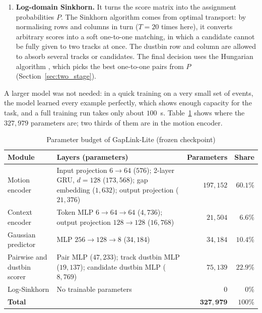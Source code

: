 \begin{enumerate}
    \item \textbf{Log-domain Sinkhorn.} It turns the score matrix into the assignment probabilities $P$. The Sinkhorn algorithm \cite{sinkhorn1967,cuturi2013sinkhorn} comes from optimal transport: by normalising rows and columns in turn ($T=20$ times here), it converts arbitrary scores into a soft one-to-one matching, in which a candidate cannot be fully given to two tracks at once. The dustbin row and column are allowed to absorb several tracks or candidates. The final decision uses the Hungarian algorithm \cite{kuhn1955hungarian}, which picks the best one-to-one pairs from $P$ (Section~\ref{sec:two_stage}).
\end{enumerate}
A larger model was not needed: in a quick training on a very small set of events, the model learned every example perfectly, which shows enough capacity for the task, and a full training run takes only about $100$~s. Table~\ref{tab:param_breakdown} shows where the $327{,}979$ parameters are; two thirds of them are in the motion encoder.

\begin{table}[H]
    \centering
    \caption{Parameter budget of GapLink-Lite (frozen checkpoint)}
    \label{tab:param_breakdown}
    \small
    \begin{tabularx}{\textwidth}{l X r r}
        \toprule
        \textbf{Module} & \textbf{Layers (parameters)} & \textbf{Parameters} & \textbf{Share} \\
        \midrule
        Motion encoder & Input projection $6\!\to\!64$ ($576$); 2-layer GRU, $d=128$ ($173{,}568$); gap embedding ($1{,}632$); output projection ($21{,}376$) & $197{,}152$ & $60.1\%$ \\
        Context encoder & Token MLP $6\!\to\!64\!\to\!64$ ($4{,}736$); output projection $128\!\to\!128$ ($16{,}768$) & $21{,}504$ & $6.6\%$ \\
        Gaussian predictor & MLP $256\!\to\!128\!\to\!8$ ($34{,}184$) & $34{,}184$ & $10.4\%$ \\
        Pairwise and dustbin scorer & Pair MLP ($47{,}233$); track dustbin MLP ($19{,}137$); candidate dustbin MLP ($8{,}769$) & $75{,}139$ & $22.9\%$ \\
        Log-Sinkhorn & No trainable parameters & $0$ & $0\%$ \\
        \midrule
        \textbf{Total} & & $\mathbf{327{,}979}$ & $100\%$ \\
        \bottomrule
    \end{tabularx}
\end{table}


